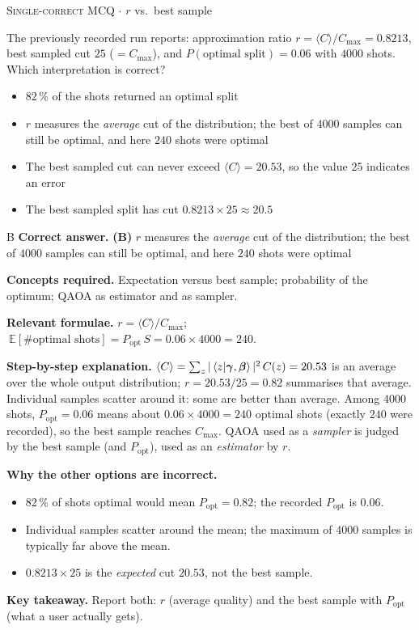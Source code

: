 \documentclass[11pt,a4paper]{article}
\newcommand{\optlabel}[1]{\textbf{(#1)}}
\newcommand{\correctlabel}[1]{\textcolor{okgreen}{\textbf{(#1)}\,\ding{51}}}
\newenvironment{qitem}[1]{\begin{list}{}{\setlength{\leftmargin}{3.3em}\setlength{\labelwidth}{3.1em}%
  \setlength{\labelsep}{0.2em}\setlength{\topsep}{3pt}\setlength{\parsep}{3pt}}\item[\textbf{Q.#1}\hfill]}{\end{list}}
\newcommand{\qmeta}[2]{{\footnotesize\color{black!60}\textsc{#1} \;$\cdot$\; #2}\par}
\begin{document}
\begin{qitem}{57}
\qmeta{Single-correct MCQ}{$r$ vs.\ best sample}
The previously recorded run reports: approximation ratio $r = \langle C\rangle/C_{\max} = 0.8213$, best sampled cut $25$
($= C_{\max}$), and $P(\text{optimal split}) = 0.06$ with $4000$ shots. Which interpretation is correct?
\begin{itemize}[leftmargin=2.6em, labelsep=0.4em, itemsep=2pt, topsep=3pt]
\item[\optlabel{A}] $82\,\%$ of the shots returned an optimal split
\item[\correctlabel{B}] $r$ measures the \emph{average} cut of the distribution; the best of $4000$ samples can still be optimal, and here $240$ shots were optimal
\item[\optlabel{C}] The best sampled cut can never exceed $\langle C\rangle = 20.53$, so the value $25$ indicates an error
\item[\optlabel{D}] The best sampled split has cut $0.8213 \times 25 \approx 20.5$
\end{itemize}
\end{qitem}
\begin{solbox}{B}
\textbf{\color{brand}Correct answer.} \textcolor{okgreen}{\textbf{(B)}} $r$ measures the \emph{average} cut of the distribution; the best of $4000$ samples can still be optimal, and here $240$ shots were optimal

\textbf{\color{brand}Concepts required.} Expectation versus best sample; probability of the optimum; QAOA as estimator and as sampler.

\textbf{\color{brand}Relevant formulae.} $r = \langle C\rangle/C_{\max}$; $\ \mathbb E[\#\text{optimal shots}] = P_{\text{opt}}\,S = 0.06\times4000 = 240$.

\textbf{\color{brand}Step-by-step explanation.} $\langle C\rangle = \sum_z |\braket{z|\boldsymbol\gamma,\boldsymbol\beta}|^2\,C(z) = 20.53$ is an average over the whole output distribution;
$r = 20.53/25 = 0.82$ summarises that average. Individual samples scatter around it: some are better than average.
Among $4000$ shots, $P_{\text{opt}} = 0.06$ means about $0.06\times4000 = 240$ optimal shots (exactly $240$ were recorded), so the best
sample reaches $C_{\max}$. QAOA used as a \emph{sampler} is judged by the best sample (and $P_{\text{opt}}$), used as an \emph{estimator}
by $r$.

\textbf{\color{brand}Why the other options are incorrect.}
\begin{itemize}[leftmargin=2.4em, itemsep=1pt, topsep=2pt]
\item[\textbf{(A)}] $82\,\%$ of shots optimal would mean $P_{\text{opt}} = 0.82$; the recorded $P_{\text{opt}}$ is $0.06$.
\item[\textbf{(C)}] Individual samples scatter around the mean; the maximum of 4000 samples is typically far above the mean.
\item[\textbf{(D)}] $0.8213\times25$ is the \emph{expected} cut $20.53$, not the best sample.
\end{itemize}
\textbf{\color{brand}Key takeaway.} Report both: $r$ (average quality) and the best sample with $P_{\text{opt}}$ (what a user actually gets).
\end{solbox}
\end{document}
